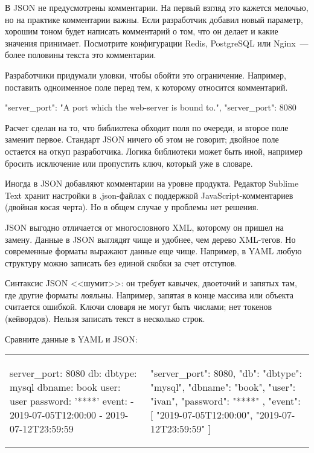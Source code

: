В JSON не предусмотрены комментарии. На первый взгляд это кажется мелочью, но на
практике комментарии важны. Если разработчик добавил новый параметр, хорошим
тоном будет написать комментарий о том, что он делает и какие значения
принимает. Посмотрите конфигурации Redis, PostgreSQL или Nginx~--- более
половины текста это комментарии.

Разработчики придумали уловки, чтобы обойти это ограничение. Например, поставить
одноименное поле перед тем, к которому относится комментарий.

\begin{english}
  \begin{json}
{
    "server_port": "A port which the web-server is bound to.",
    "server_port": 8080
}
  \end{json}
\end{english}

Расчет сделан на то, что библиотека обходит поля по очереди, и второе поле
заменит первое. Стандарт JSON ничего об этом не говорит; двойное поле остается
на откуп разработчика. Логика библиотеки может быть иной, например бросить
исключение или пропустить ключ, который уже в словаре.

Иногда в JSON добавляют комментарии на уровне продукта. Редактор Sublime Text
хранит настройки в .json-файлах с поддержкой JavaScript-комментариев (двойная
косая черта). Но в общем случае у проблемы нет решения.

JSON выгодно отличается от многословного XML, которому он пришел на
замену. Данные в JSON выглядят чище и удобнее, чем дерево XML-тегов. Но
современные форматы выражают данные еще чище. Например, в YAML любую структуру
можно записать без единой скобки за счет отступов.

Синтаксис JSON <<шумит>>: он требует кавычек, двоеточий и запятых там, где
другие форматы лояльны. Например, запятая в конце массива или объекта считается
ошибкой. Ключи словаря не могут быть числами; нет токенов (кейвордов). Нельзя
записать текст в несколько строк.

Сравните данные в YAML и JSON:

\noindent
\begin{tabular}{ @{}p{5cm} @{}p{5cm} }

\begin{english}
  \begin{yaml}
server_port: 8080
db:
  dbtype:   mysql
  dbname:   book
  user:     user
  password: '****'
event:
  - 2019-07-05T12:00:00
  - 2019-07-12T23:59:59
  \end{yaml}
\end{english}

&

\begin{english}
  \begin{json}
{
    "server_port": 8080,
    "db": {
        "dbtype":   "mysql",
        "dbname":   "book",
        "user":     "ivan",
        "password": "****"
    },
    "event": [
        "2019-07-05T12:00:00",
        "2019-07-12T23:59:59"
    ]
}
  \end{json}
\end{english}

\end{tabular}

